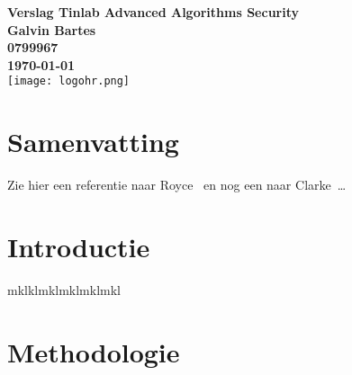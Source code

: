 \documentclass{article}
\begin{document}
\sffamily
\begin{titlepage}
  \centering
    \vfill
    {\bfseries\Huge
      Verslag Tinlab Advanced Algorithms Security \\
        \vskip2cm
      }
      {\bfseries\Large
        Galvin Bartes\\
      }
      {
        \bfseries\normalsize
        0799967\\
        \vskip1cm
        \today\\
    }    
    \vfill
    \texttt{[image: logohr.png]} %
    \vfill
    \vfill
\end{titlepage}



\newpage
\section{Samenvatting}
Zie hier een referentie naar Royce~\cite{royce1987managing} en nog een naar Clarke~\cite{modelchecking}\ldots  ~\cite{locke_2020}
\newpage
\tableofcontents

\newpage
\section{Introductie}
mklklmklmklmklmkl


\newpage
\section{Methodologie}


\end{document}
